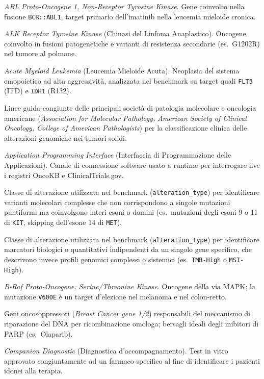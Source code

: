 \documentclass[11pt,a4paper]{article}
\newcommand{\code}[1]{\texttt{\small #1}}
\begin{document}
\begin{description}[leftmargin=1.4em,style=nextline]
\item[ABL1] \emph{ABL Proto-Oncogene 1, Non-Receptor Tyrosine Kinase}. Gene coinvolto nella fusione \code{BCR::ABL1}, target primario dell'imatinib nella leucemia mieloide cronica.
\item[ALK] \emph{ALK Receptor Tyrosine Kinase} (Chinasi del Linfoma Anaplastico). Oncogene coinvolto in fusioni patogenetiche e varianti di resistenza secondarie (es.\ G1202R) nel tumore al polmone.
\item[AML] \emph{Acute Myeloid Leukemia} (Leucemia Mieloide Acuta). Neoplasia del sistema emopoietico ad alta aggressività, analizzata nel benchmark su target quali \code{FLT3} (ITD) e \code{IDH1} (R132).
\item[AMP/ASCO/CAP] Linee guida congiunte delle principali società di patologia molecolare e oncologia americane (\emph{Association for Molecular Pathology, American Society of Clinical Oncology, College of American Pathologists}) per la classificazione clinica delle alterazioni genomiche nei tumori solidi.
\item[API] \emph{Application Programming Interface} (Interfaccia di Programmazione delle Applicazioni). Canale di connessione software usato a runtime per interrogare live i registri OncoKB e ClinicalTrials.gov.
\item[atypical] Classe di alterazione utilizzata nel benchmark (\code{alteration\_type}) per identificare varianti molecolari complesse che non corrispondono a singole mutazioni puntiformi ma coinvolgono interi esoni o domini (es.\ mutazioni degli esoni 9 o 11 di \code{KIT}, skipping dell'esone 14 di \code{MET}).
\item[biomarker] Classe di alterazione utilizzata nel benchmark (\code{alteration\_type}) per identificare marcatori biologici o quantitativi indipendenti da un singolo gene specifico, che descrivono invece profili genomici complessi o sistemici (es.\ \code{TMB-High} o \code{MSI-High}).
\item[BRAF] \emph{B-Raf Proto-Oncogene, Serine/Threonine Kinase}. Oncogene della via MAPK; la mutazione \code{V600E} è un target d'elezione nel melanoma e nel colon-retto.
\item[BRCA1 / BRCA2] Geni oncosoppressori (\emph{Breast Cancer gene 1/2}) responsabili del meccanismo di riparazione del DNA per ricombinazione omologa; bersagli ideali degli inibitori di PARP (es.\ Olaparib).
\item[CDx] \emph{Companion Diagnostic} (Diagnostica d'accompagnamento). Test in vitro approvato congiuntamente ad un farmaco specifico al fine di identificare i pazienti idonei alla terapia.

\end{description}
\end{document}
